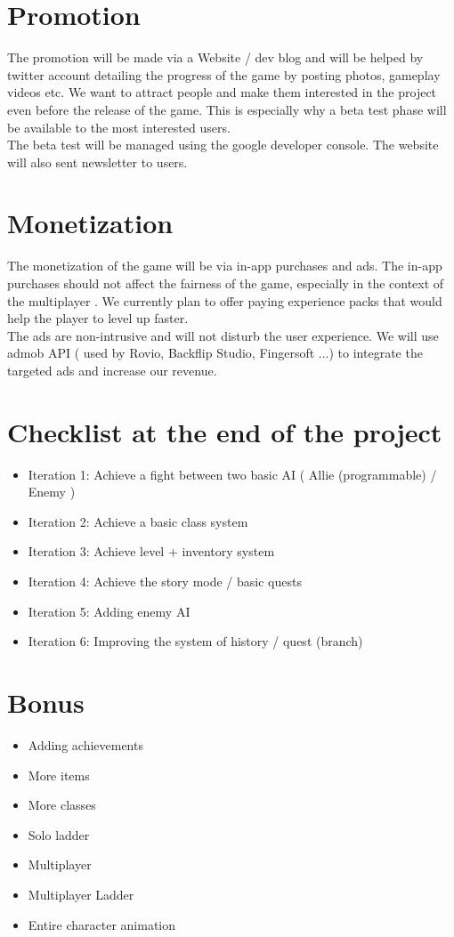 \documentclass[16pt, oneside]{report}
\begin{document}
\chapter{Promotion}
The promotion will be made via a Website / dev blog and will be helped by twitter account detailing the progress of the game by posting photos, gameplay videos etc. We want to attract people and make them interested in the project even before the release of the game. This is especially why a beta test phase will be available to the most interested users. \\
 The beta test will be managed using the google developer console. The website will also sent newsletter to users.\\
\chapter{Monetization}
The monetization of the game will be via in-app purchases and ads.
The in-app purchases should not affect the fairness of the game, especially in the context of the multiplayer . We currently plan to offer paying experience packs that would help the player to level up faster. \\
The ads are non-intrusive and will not disturb the user experience. We will use admob  API ( used by Rovio, Backflip Studio, Fingersoft ...) to integrate the targeted ads and increase our revenue.

\chapter{Checklist at the end of the project}
\begin{itemize}
\item Iteration 1: Achieve a fight between two basic AI ( Allie (programmable) / Enemy )
\item Iteration 2: Achieve a basic class system
\item Iteration 3: Achieve level + inventory system
\item Iteration 4: Achieve the story mode / basic quests
\item Iteration 5: Adding enemy AI
\item Iteration 6: Improving the system of history / quest (branch)\\
\end{itemize}

\chapter{Bonus}
\begin{itemize}
	\item	Adding achievements
	\item	More items
	\item	More classes
	\item	Solo ladder
	\item Multiplayer
	\item	 Multiplayer Ladder
	\item	Entire character animation
\end{itemize}
\end{document}
